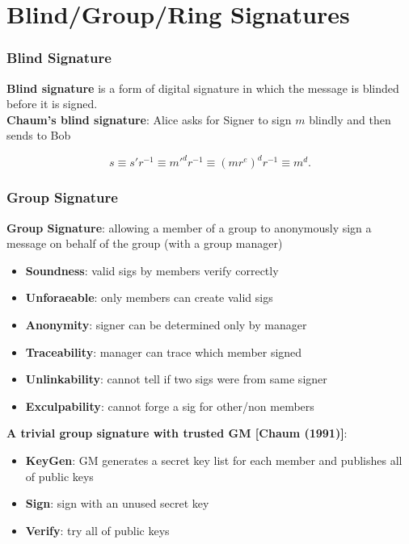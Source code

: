 \section{Blind/Group/Ring Signatures}
\begin{frame}\frametitle{Blind Signature}
\textbf{Blind signature} is a form of digital signature in which the message is blinded before it is signed.\\
\textbf{Chaum's blind signature}: Alice asks for Signer to sign $m$ blindly and then sends to Bob
\begin{figure}
\begin{center}

\end{center}
\end{figure}
\[s \equiv s'r^{-1} \equiv m'^dr^{-1} \equiv (mr^e)^dr^{-1} \equiv m^d.\]
\end{frame}
\begin{frame}\frametitle{Group Signature}
\textbf{Group Signature}: allowing a member of a group to anonymously sign a message on behalf of the group (with a group manager)
\begin{itemize}
\item \textbf{Soundness}: valid sigs by members verify correctly
\item \textbf{Unforaeable}: only members can create valid sigs
\item \textbf{Anonymity}: signer can be determined only by manager
\item \textbf{Traceability}: manager can trace which member signed
\item \textbf{Unlinkability}: cannot tell if two sigs were from same signer
\item \textbf{Exculpability}: cannot forge a sig for other/non members
\end{itemize}
\textbf{A trivial group signature with trusted GM [Chaum (1991)]}:\\
\begin{itemize}
\item \textbf{KeyGen}: GM generates a secret key list for each member and publishes all of public keys
\item \textbf{Sign}: sign with an unused secret key
\item \textbf{Verify}: try all of public keys
\end{itemize}
\end{frame}
